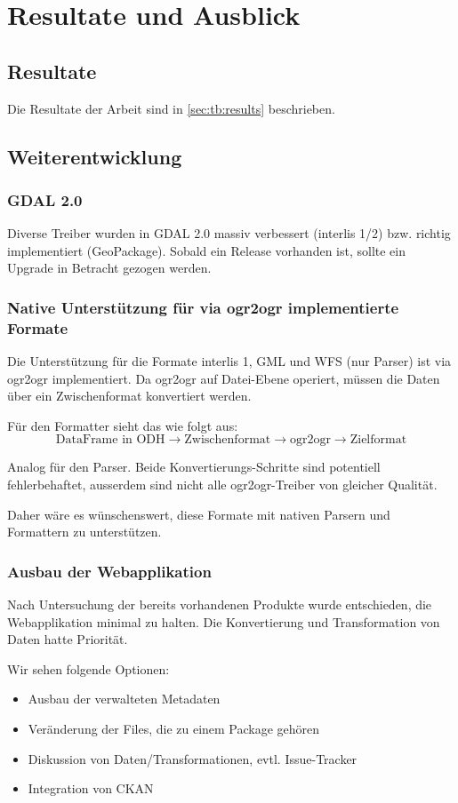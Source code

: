 \chapter{Resultate und Ausblick}

\section{Resultate}
Die Resultate der Arbeit sind in \vref{sec:tb:results} beschrieben.

\section{Weiterentwicklung} \label{sec:tb:further-dev}

\subsection{GDAL 2.0}
Diverse Treiber wurden in GDAL 2.0 massiv verbessert (\gls{interlis} 1/2) bzw. richtig implementiert (GeoPackage). Sobald ein Release vorhanden ist, sollte ein Upgrade in Betracht gezogen werden.

\subsection{Native Unterstützung für via ogr2ogr implementierte Formate}
Die Unterstützung für die Formate \gls{interlis} 1, GML und WFS (nur Parser) ist via ogr2ogr implementiert. Da ogr2ogr auf Datei-Ebene operiert, müssen die Daten über ein Zwischenformat konvertiert werden.

Für den Formatter sieht das wie folgt aus:
$$ \text{DataFrame in ODH} \to \text{Zwischenformat} \to \text{ogr2ogr} \to \text{Zielformat} $$

Analog für den Parser. Beide Konvertierungs-Schritte sind potentiell fehlerbehaftet, ausserdem sind nicht alle ogr2ogr-Treiber von gleicher Qualität.

Daher wäre es wünschenswert, diese Formate mit nativen Parsern und Formattern zu unterstützen. 

\subsection{Ausbau der Webapplikation}
Nach Untersuchung der bereits vorhandenen Produkte wurde entschieden, die Webapplikation minimal zu halten. Die Konvertierung und Transformation von Daten hatte Priorität.

Wir sehen folgende Optionen:
\begin{itemize}
\item Ausbau der verwalteten Metadaten
\item Veränderung der Files, die zu einem Package gehören
\item Diskussion von Daten/Transformationen, evtl. Issue-Tracker
\item Integration von CKAN
\end{itemize}

